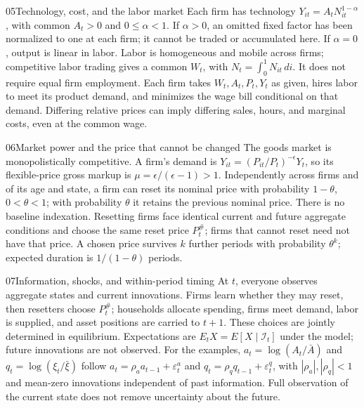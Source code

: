 \begin{modelsetup}[1]
\begin{modelcondition}{05}{Technology, cost, and the labor market}
Each firm has technology $Y_{it}=A_tN_{it}^{1-\alpha}$, with common $A_t>0$
and $0\leq\alpha<1$. If $\alpha>0$, an omitted fixed factor has been normalized
to one at each firm; it cannot be traded or accumulated here. If $\alpha=0$,
output is linear in labor. Labor is homogeneous and mobile across firms;
competitive labor trading gives a common $W_t$, with $N_t=\int_0^1N_{it}\,di$.
It does not require equal firm employment. Each firm takes $W_t,A_t,P_t,Y_t$
as given, hires labor to meet its product demand, and minimizes the wage bill
conditional on that demand. Differing relative prices can imply differing
sales, hours, and marginal costs, even at the common wage.
\end{modelcondition}
\end{modelsetup}

\begin{modelsetup}[1]
\begin{modelcondition}{06}{Market power and the price that cannot be changed}
The goods market is monopolistically competitive. A firm's demand is
$Y_{it}=(P_{it}/P_t)^{-\epsilon}Y_t$, so its flexible-price gross markup is
$\mu=\epsilon/(\epsilon-1)>1$. Independently across firms and of its age and state, a firm can
reset its nominal price with probability $1-\theta$, $0<\theta<1$; with
probability $\theta$ it retains the previous nominal price. There is no baseline
indexation. Resetting firms face identical current and future aggregate conditions
and choose the same reset price $P_t^{\#}$; firms that cannot reset need not have
that price. A chosen price survives $k$ further periods with probability
$\theta^k$; expected duration is $1/(1-\theta)$ periods.
\end{modelcondition}
\end{modelsetup}

\begin{modelsetup}[1]
\begin{modelcondition}{07}{Information, shocks, and within-period timing}
At $t$, everyone observes aggregate states and current innovations. Firms learn
whether they may reset, then resetters choose $P_t^{\#}$; households allocate
spending, firms meet demand, labor is supplied, and asset positions are carried
to $t+1$. These choices are jointly determined in equilibrium. Expectations are
$E_tX=E[X\mid\mathcal I_t]$ under the model; future innovations are not observed.
For the examples, $a_t=\log(A_t/\bar A)$ and $q_t=\log(\xi_t/\bar\xi)$ follow
$a_t=\rho_a a_{t-1}+\varepsilon_t^a$ and
$q_t=\rho_q q_{t-1}+\varepsilon_t^q$, with $|\rho_a|,|\rho_q|<1$ and
mean-zero innovations independent of past information. Full observation of the
current state does not remove uncertainty about the future.
\end{modelcondition}
\end{modelsetup}

